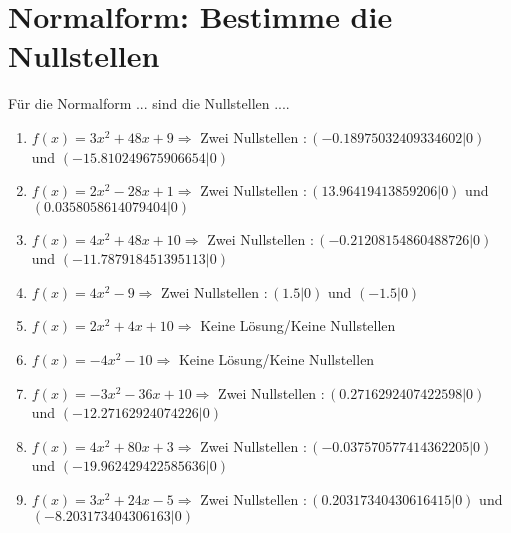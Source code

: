 \documentclass{article}%
\begin{document}
%
\section{Normalform: Bestimme die Nullstellen}%
\label{sec:NormalformBestimmedieNullstellen}%
Für die Normalform ... sind die Nullstellen ....%
\begin{enumerate}[label=\alph*)]%
\item%
\newline\vspace{0.5cm}$f(x)=3x^2 + 48x + 9 \Rightarrow $ Zwei Nullstellen $: (-0.18975032409334602|0) $ und $ (-15.810249675906654|0) $%
\item%
\newline\vspace{0.5cm}$f(x)=2x^2 - 28x + 1 \Rightarrow $ Zwei Nullstellen $: (13.96419413859206|0) $ und $ (0.0358058614079404|0) $%
\item%
\newline\vspace{0.5cm}$f(x)=4x^2 + 48x + 10 \Rightarrow $ Zwei Nullstellen $: (-0.21208154860488726|0) $ und $ (-11.787918451395113|0) $%
\item%
\newline\vspace{0.5cm}$f(x)=4x^2 - 9 \Rightarrow $ Zwei Nullstellen $: (1.5|0) $ und $ (-1.5|0) $%
\item%
\newline\vspace{0.5cm}$f(x)=2x^2 + 4x + 10 \Rightarrow  $ Keine Lösung/Keine Nullstellen $ $%
\item%
\newline\vspace{0.5cm}$f(x)=-4x^2 - 10 \Rightarrow  $ Keine Lösung/Keine Nullstellen $ $%
\item%
\newline\vspace{0.5cm}$f(x)=-3x^2 - 36x + 10 \Rightarrow $ Zwei Nullstellen $: (0.2716292407422598|0) $ und $ (-12.27162924074226|0) $%
\item%
\newline\vspace{0.5cm}$f(x)=4x^2 + 80x + 3 \Rightarrow $ Zwei Nullstellen $: (-0.037570577414362205|0) $ und $ (-19.962429422585636|0) $%
\item%
\newline\vspace{0.5cm}$f(x)=3x^2 + 24x - 5 \Rightarrow $ Zwei Nullstellen $: (0.20317340430616415|0) $ und $ (-8.203173404306163|0) $%

\end{enumerate}
\end{document}
